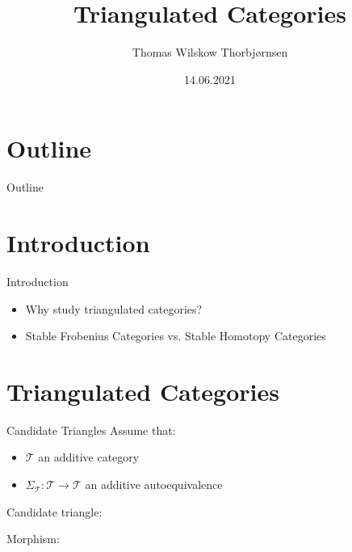 \documentclass{beamer}
\title{Triangulated Categories}
\author{Thomas Wilskow Thorbjørnsen}
\date{14.06.2021}
\begin{document}
    
    \begin{frame}
        \titlepage
    \end{frame}

    \section*{Outline}
    \begin{frame}{Outline}
        \tableofcontents
    \end{frame}

    \section{Introduction}
    \begin{frame}{Introduction}
        \begin{itemize}
            \item Why study triangulated categories?
            \item Stable Frobenius Categories vs. Stable Homotopy Categories
        \end{itemize}
    \end{frame}

    \section{Triangulated Categories}
        \begin{frame}{Candidate Triangles}
            Assume that:
            \begin{itemize}
                \item $\mathcal{T}$ an additive category
                \item $\Sigma_{\mathcal{T}}:\mathcal{T}\rightarrow \mathcal{T}$ an additive autoequivalence
            \end{itemize}
            
            \begin{definition}
                \begin{flushleft}
                    Candidate triangle:
                \end{flushleft}

                \begin{flushleft}
                    Morphism:
                \end{flushleft}
            \end{definition}
        \end{frame}
\end{document}
